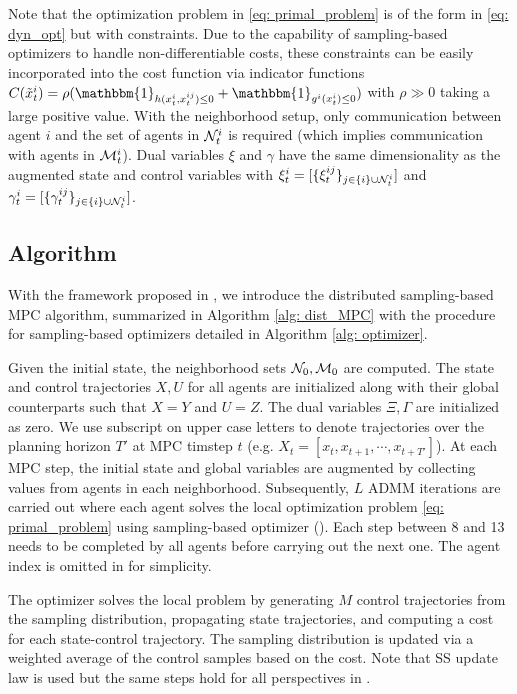 \documentclass[twoside,11pt]{article}
\begin{document}
Note that the optimization problem in \cref{eq: primal_problem} is of the form in \cref{eq: dyn_opt} but with constraints. Due to the capability of sampling-based optimizers to handle non-differentiable costs, these constraints can be easily incorporated into the cost function via indicator functions $C(\tilde{x}^i_t)=\rho(\mathbbm{1}_{h(x^i_t, x^{ij}_t)\leq 0} + \mathbbm{1}_{g^i(x^i_t)\leq 0})$ with $\rho \gg 0$ taking a large positive value. With the neighborhood setup, only communication between agent $i$ and the set of agents in ${\cal N}^i_t$ is required (which implies communication with agents in ${\cal M}^i_t$). Dual variables $\xi$ and $\gamma$ have the same dimensionality as the augmented state and control  variables with $\xi^i_t = [\{\xi^{ij}_t\}_{j\in\{i\}\cup {\cal N}^i_t}]$ and $\gamma^i_t = [\{\gamma^{ij}_t\}_{j\in\{i\}\cup {\cal N}^i_t}]$.

\subsection{Algorithm}
\label{sec: algorithm}



With the framework proposed in , we introduce the distributed sampling-based MPC algorithm, summarized in Algorithm \ref{alg: dist_MPC} with the procedure for sampling-based optimizers detailed in Algorithm \ref{alg: optimizer}.

Given the initial state, the neighborhood sets ${\cal N}_0, {\cal M}_0$ are computed. The state and control trajectories $X, U$ for all agents are initialized along with their global counterparts such that $X=Y$ and $U=Z$. The dual variables $\Xi, \Gamma$ are initialized as zero. We use subscript on upper case letters to denote trajectories over the planning horizon $T'$ at MPC timstep $t$ (e.g. $X_t = [x_t, x_{t+1}, \cdots, x_{t+T'}]$). At each MPC step, the initial state and global variables are augmented by collecting values from agents in each neighborhood. Subsequently, $L$ \ac{ADMM} iterations are carried out where each agent solves the local optimization problem \eqref{eq: primal_problem} using sampling-based optimizer (). Each step between 8 and 13 needs to be completed by all agents before carrying out the next one. The agent index is omitted in  for simplicity.

The optimizer solves the local problem by generating $M$ control trajectories from the sampling distribution, propagating state trajectories, and computing a cost for each state-control trajectory. The sampling distribution is updated via a weighted average of the control samples based on the cost. Note that \ac{SS} update law is used but the same steps hold for all perspectives in .
\end{document}

